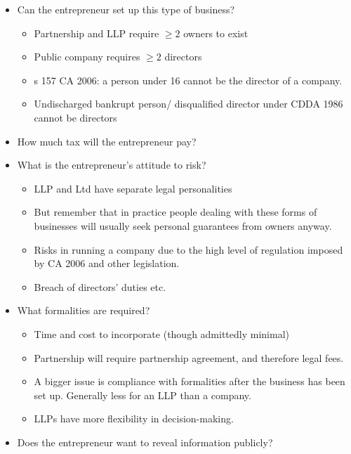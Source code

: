 \documentclass[
]{article}
\providecommand{\tightlist}{%
  \setlength{\itemsep}{0pt}\setlength{\parskip}{0pt}}
\begin{document}
\begin{itemize}
\tightlist
\item
  Can the entrepreneur set up this type of business?

  \begin{itemize}
  \tightlist
  \item
    Partnership and LLP require {\(\geq 2\)} owners to exist
  \item
    Public company requires {\(\geq 2\)} directors
  \item
    s 157 CA 2006: a person under 16 cannot be the director of a
    company.
  \item
    Undischarged bankrupt person/ disqualified director under CDDA 1986
    cannot be directors
  \end{itemize}
\item
  How much tax will the entrepreneur pay?
\item
  What is the entrepreneur's attitude to risk?

  \begin{itemize}
  \tightlist
  \item
    LLP and Ltd have separate legal personalities
  \item
    But remember that in practice people dealing with these forms of
    businesses will usually seek personal guarantees from owners anyway.
  \item
    Risks in running a company due to the high level of regulation
    imposed by CA 2006 and other legislation.
  \item
    Breach of directors' duties etc.
  \end{itemize}
\item
  What formalities are required?

  \begin{itemize}
  \tightlist
  \item
    Time and cost to incorporate (though admittedly minimal)
  \item
    Partnership will require partnership agreement, and therefore legal
    fees.
  \item
    A bigger issue is compliance with formalities after the business has
    been set up. Generally less for an LLP than a company.
  \item
    LLPs have more flexibility in decision-making.
  \end{itemize}
\item
  Does the entrepreneur want to reveal information publicly?


\end{itemize}
\end{document}
